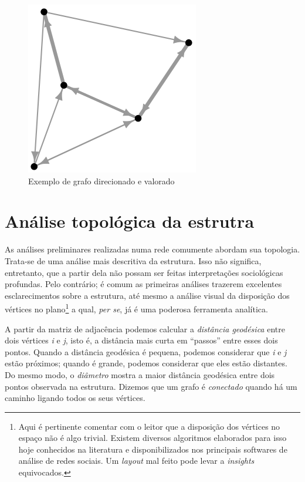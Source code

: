 \documentclass[a4paper, 12pt, openright, oneside, german, french, english, brazil]{abntex2}
\begin{document}
	
	\begin{figure}[!ht]
		\centering
		\caption{Exemplo de grafo direcionado e valorado}
		\label{weighted-graph}
		\includegraphics[scale=.4]{weighted-graph.png}
	\end{figure}
	
	
	\section{Análise topológica da estrutra}
	
	As análises preliminares realizadas numa rede comumente abordam sua topologia. Trata-se de uma análise mais descritiva da estrutura. Isso não significa, entretanto, que a partir dela não possam ser feitas interpretações sociológicas profundas. Pelo contrário; é comum as primeiras análises trazerem excelentes esclarecimentos sobre a estrutura, até mesmo a análise visual da disposição dos vértices no plano\footnote{Aqui é pertinente comentar com o leitor que a disposição dos vértices no espaço não é algo trivial. Existem diversos algoritmos elaborados para isso hoje conhecidos na literatura e disponibilizados nos principais softwares de análise de redes sociais. Um \textit{layout} mal feito pode levar a \textit{insights} equivocados.} a qual, \textit{per se}, já é uma poderosa ferramenta analítica.
	
	A partir da matriz de adjacência podemos calcular a \textit{distância geodésica} entre dois vértices \textit{i} e \textit{j}, isto é, a distância mais curta em ``passos'' entre esses dois pontos. Quando a distância geodésica é pequena, podemos considerar que \textit{i} e \textit{j} estão próximos; quando é grande, podemos considerar que eles estão distantes. Do mesmo modo, o \textit{diâmetro} mostra a maior distância geodésica entre dois pontos observada na estrutura. Dizemos que um grafo é \textit{conectado} quando há um caminho ligando todos os seus vértices.
	
\end{document}

